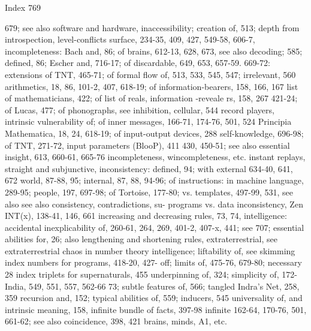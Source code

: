 Index                                                                                 769

679; see also software and hardware,             inaccessibility; creation of, 513; depth from
introspection, level-conflicts                   surface, 234-35, 409, 427, 549-58, 606-7,
incompleteness: Bach and, 86; of brains,         612-13, 628, 673, see also decoding;
585; defined, 86; Escher and, 716-17; of         discardable, 649, 653, 657-59. 669-72:
extensions of TNT, 465-71; of formal             flow of, 513, 533, 545, 547; irrelevant, 560
arithmetics, 18, 86, 101-2, 407, 618-19; of      information-bearers, 158, 166, 167
list of mathematicians, 422; of list of reals,   information -reveale rs, 158, 267
421-24; of Lucas, 477; of phonographs, see       inhibition, cellular, 544
record players, intrinsic vulnerability of; of   inner messages, 166-71, 174-76, 501, 524
Principia Mathematica, 18, 24, 618-19; of        input-output devices, 288
self-knowledge, 696-98; of TNT, 271-72,          input parameters (BlooP), 411
430,      450-51;     see    also    essential   insight, 613, 660-61, 665-76
incompleteness, wincompleteness, etc.            instant replays, straight and subjunctive,
inconsistency: defined, 94; with external        634-40, 641, 672
world, 87-88, 95; internal, 87, 88, 94-96; of    instructions: in machine language, 289-95;
people, 197, 697-98; of Tortoise, 177-80;        vs. templates, 497-99, 531, see also
see also consistency, contradictions, su-        programs vs. data
inconsistency, Zen                               INT(x), 138-41, 146, 661
increasing and decreasing rules, 73, 74,         intelligence: accidental inexplicability of,
260-61, 264, 269, 401-2, 407-x, 441; see         707;     essential     abilities     for,    26;
also lengthening and shortening rules,           extraterrestrial,      see       extraterrestrial
chaos in number theory                           intelligence; liftability of, see skimming
index numbers for programs, 418-20, 427-         off; limits of, 475-76, 679-80; necessary
28 index triplets for supernaturals, 455         underpinning of, 324; simplicity of, 172-
India, 549, 551, 557, 562-66                     73; subtle features of, 566; tangled
Indra's Net, 258, 359                            recursion and, 152; typical abilities of, 559;
inducers, 545                                    universality of, and intrinsic meaning, 158,
infinite bundle of facts, 397-98 infinite        162-64, 170-76, 501, 661-62; see also
coincidence, 398, 421                            brains, minds, A1, etc.
